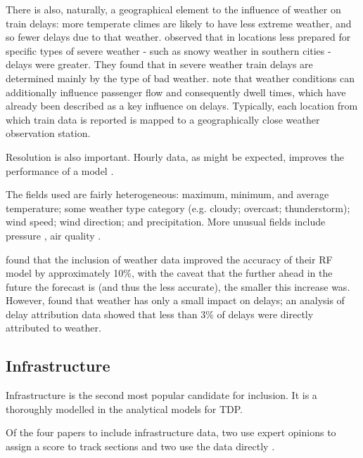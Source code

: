\documentclass{article}
\begin{document}
There is also, naturally, a geographical element to the influence of weather on train delays: more temperate climes are likely to have less extreme weather, and so fewer delays due to that weather. \cite{wang_et_al_2019} observed that in locations less prepared for specific types of severe weather - such as snowy weather in southern cities - delays were greater. They found that in severe weather train delays are determined mainly by the type of bad weather. \cite{oneto_et_al_2016} note that weather conditions can additionally influence passenger flow and consequently dwell times, which have already been described as a key influence on delays. Typically, each location from which train data is reported is mapped to a geographically close weather observation station.

Resolution is also important. Hourly data, as might be expected, improves the performance of a model \cite{nabian_et_al_2019}\cite{wang_et_al_2019}.

The fields used are fairly heterogeneous: maximum, minimum, and average temperature; some weather type category (e.g. cloudy; overcast; thunderstorm); wind speed; wind direction; and precipitation. More unusual fields include pressure \cite{oneto_et_al_2016}\cite{oneto_et_al_2017b}\cite{oneto_et_al_2019}, air quality \cite{wang_et_al_2019}.

\cite{oneto_et_al_2016} found that the inclusion of weather data improved the accuracy of their RF model by approximately 10\%, with the caveat that the further ahead in the future the forecast is (and thus the less accurate), the smaller this increase was. However, \cite{nair_et_al_2019} found that weather has only a small impact on delays; an analysis of delay attribution data showed that less than 3\% of delays were directly attributed to weather. 


\subsection{Infrastructure}

Infrastructure is the second most popular candidate for inclusion.  It is a thoroughly modelled in the analytical models for TDP.

Of the four papers to include infrastructure data, two use expert opinions to assign a score to track sections \cite{milinkovic_et_al_2013} \cite{markovic_et_al_2015} and two use the data directly \cite{barbour_et_al_2018} \cite{nair_et_al_2019}.
\end{document}

